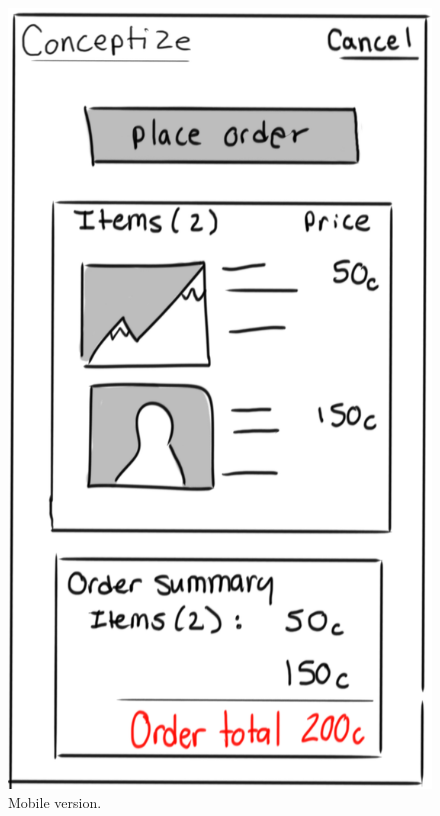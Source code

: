 \documentclass[]{article}
\begin{document}
\begin{enumerate}
		\begin{figure}
		  \includegraphics[width=\linewidth]{./pictures/checkout_mobile.png}
		  \caption{Mobile version.}
		  \label{fig:mobile10}
		\end{figure}
		

\end{enumerate}
\end{document}
